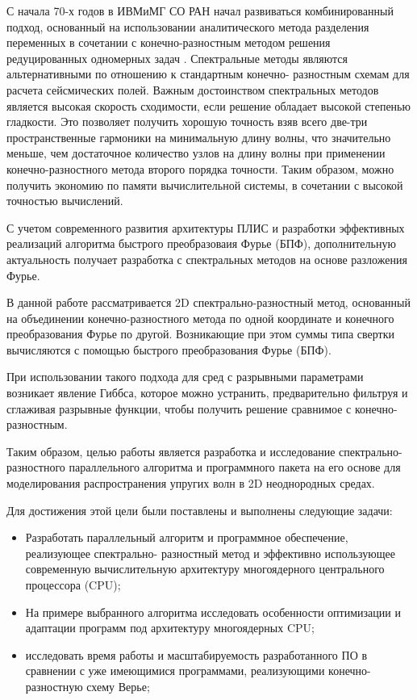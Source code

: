 С начала 70-х годов в ИВМиМГ СО РАН начал развиваться комбинированный подход, основанный на использовании аналитического метода разделения переменных в сочетании с конечно-разностным методом решения редуцированных одномерных задач \cite{alex}. Спектральные методы являются альтернативными по отношению к стандартным конечно-
разностным схемам для расчета сейсмических полей. Важным достоинством
спектральных методов является высокая скорость сходимости, если решение обладает
высокой степенью гладкости. Это позволяет получить хорошую точность взяв всего две-три
пространственные гармоники на минимальную длину волны, что значительно меньше, 
чем достаточное количество узлов на длину волны при применении конечно-разностного метода второго порядка точности.
Таким образом, можно получить экономию по памяти вычислительной системы, в сочетании с высокой точностью вычислений.

С учетом современного развития архитектуры ПЛИС и разработки эффективных реализаций алгоритма быстрого преобразоваия Фурье (БПФ), дополнительную актуальность получает разработка с спектральных методов на основе разложения Фурье.

В данной работе рассматривается 2D спектрально-разностный метод, основанный на
объединении конечно-разностного метода по одной координате и конечного
преобразования Фурье по другой. Возникающие при этом суммы
типа свертки вычисляются с помощью быстрого преобразования Фурье (БПФ).

При использовании такого подхода для сред с разрывными параметрами возникает явление Гиббса,
которое можно устранить, предварительно фильтруя и сглаживая разрывные функции,
чтобы получить решение сравнимое с конечно-разностным.

Таким образом, целью работы является разработка  и исследование спектрально-разностного
параллельного алгоритма и программного пакета на его основе для моделирования распространения
упругих волн в 2D неоднородных средах.

Для достижения этой цели были поставлены и выполнены следующие задачи:
\begin{itemize}
    \item Разработать параллельный алгоритм и программное обеспечение, реализующее спектрально-
разностный метод и эффективно использующее современную вычислительную
архитектуру многоядерного центрального процессора (CPU);
    \item На примере выбранного алгоритма исследовать особенности оптимизации и адаптации программ под архитектуру многоядерных CPU;
    \item исследовать время работы и масштабируемость разработанного ПО в
сравнении с уже имеющимися программами, реализующими конечно-разностную схему
Верье;
\end{itemize}

